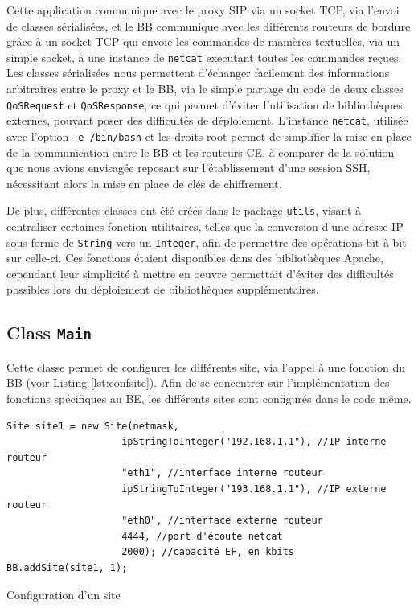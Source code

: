\documentclass[a4paper,11pt]{article}
\let\Oldsubsection\subsection
\renewcommand{\subsection}{\FloatBarrier\Oldsubsection}
\begin{document}
Cette application communique avec le proxy SIP via un socket TCP, via l'envoi de classes sérialisées, et le BB communique avec les différents routeurs de bordure grâce à un socket TCP qui envoie les commandes de manières textuelles, via un simple socket, à une instance de \texttt{netcat} executant toutes les commandes reçues. 
Les classes sérialisées nous permettent d'échanger facilement des informations arbitraires entre le proxy et le BB, via le simple partage du code de deux classes \texttt{QoSRequest} et \texttt{QoSResponse}, ce qui permet d'éviter l'utilisation de bibliothèques externes, pouvant poser des difficultés de déploiement.
L'instance \texttt{netcat}, utilisée avec l'option \texttt{-e /bin/bash} et les droits root permet de simplifier la mise en place de la communication entre le BB et les routeurs CE, à comparer de la solution que nous avions envisagée reposant sur l'établissement d'une session SSH, nécessitant alors la mise en place de clés de chiffrement.

De plus, différentes classes ont été créés dans le package \texttt{utils}, visant à centraliser certaines fonction utilitaires, telles que la conversion d'une adresse IP sous forme de \texttt{String} vers un \texttt{Integer}, afin de permettre des opérations bit à bit sur  celle-ci. Ces fonctions étaient disponibles dans des bibliothèques Apache, cependant leur simplicité à mettre en oeuvre permettait d'éviter des difficultés possibles lors du déploiement de bibliothèques supplémentaires.


\subsection{Class \texttt{Main}}

Cette classe permet de configurer les différents site, via l'appel à une fonction du BB (voir Listing \ref{lst:confsite}). Afin de se concentrer sur l'implémentation des fonctions spécifiques au BE, les différents sites sont configurés dans le code même.

\begin{listing}[htp]
    \begin{verbatim}
Site site1 = new Site(netmask,
                    ipStringToInteger("192.168.1.1"), //IP interne routeur
                    "eth1", //interface interne routeur
                    ipStringToInteger("193.168.1.1"), //IP externe routeur
                    "eth0", //interface externe routeur
                    4444, //port d'écoute netcat
                    2000); //capacité EF, en kbits
BB.addSite(site1, 1);
  \end{verbatim}
    \caption{Configuration d'un site}
    \label{lst:confsite}
\end{listing}
\end{document}

